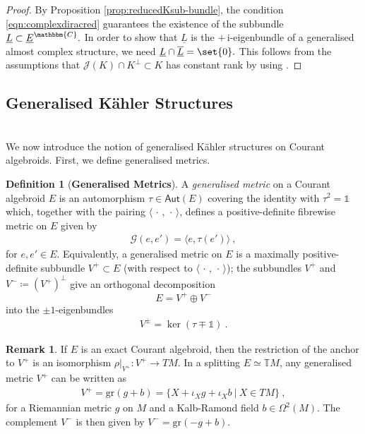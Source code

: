 \documentclass[a4paper, reqno, 11pt]{amsart}
\numberwithin{equation}{section}
\theoremstyle{definition}
\newtheorem{definition}[equation]{Definition}
\newtheorem{remark}[equation]{Remark}
\newcommand{\ip}[1]{\langle #1 \rangle}
\newcommand{\red}[1]{\underline{#1}}
\newcommand{\ii}{\mathrm{i}}
\newcommand{\IC}{\mathbbm{C}}
\newcommand{\IT}{\mathbb{T}}
\newcommand{\cG}{{\mathcal G}}
\newcommand{\cJ}{{\mathcal J}}
\newcommand{\sfOmega}{{\mathsf{\Omega}}}
\newcommand{\unit}{\mathds{1}}   			%
\newcommand{\gr}{\text{gr}}
\theoremstyle{remark}
\begin{document}
\begin{proof}
By Proposition \ref{prop:reducedKsub-bundle}, the condition \eqref{eqn:complexdiracred} guarantees the existence of the subbundle  $\red L  \subset \red E^{\IC}.$ In order to show that $\red L$ is the $+\,\ii$-eigenbundle of a generalised almost complex structure, we need  $\red L \cap \overline{\red L} = \set{0}.$ This follows from the assumptions that $\cJ(K) \cap K^\perp \subset K$  
 has constant rank by using \cite[Lemma 5.1]{Bursztyn2007reduction}. 
\end{proof}

\medskip

\subsection{Generalised K\"{a}hler Structures}~\\[5pt]
We now introduce the notion of generalised K\"ahler structures on Courant algebroids. First, we define generalised metrics.

\begin{definition}[\textbf{Generalised Metrics}]\label{defn:generalisedmetric}
A \emph{generalised metric} on a Courant algebroid $E$ is an automorphism $\tau\in\mathsf{Aut} (E)$ covering the identity with $\tau^2 = \unit$ which, together with the pairing $\ip{\,\cdot\,,\,\cdot\,}$, defines a positive-definite fibrewise metric on $E$ given by
\begin{align}\label{eqn:generalisedmetrictau}
    \cG (e, e') = \ip{e, \tau(e')} \ ,
\end{align}
for $e, e'\in E$. Equivalently, a generalised metric on $E$ is a maximally positive-definite subbundle $V^+ \subset E$  (with respect to $\ip{\,\cdot \, , \, \cdot\,}$); the subbundles $V^+$ and $V^- \coloneqq (V^+)^\perp$ give an orthogonal decomposition $$E = V^+\oplus V^-$$ into the $\pm1$-eigenbundles
\begin{align}
    V^\pm = \ker(\tau\mp\unit) \ .
\end{align}
\end{definition}

\begin{remark} If $E$ is an exact Courant algebroid, then the restriction of the anchor to $V^+$ is an isomorphism $\rho|_{V^+}:V^+\to TM$. In a splitting $E\simeq\IT M$, any generalised metric $V^+$ can be written as
\begin{align}
    V^+ = \gr(g+b) = \{X+\iota_X g+\iota_Xb \ \vert \ X\in TM\} \ ,
\end{align}
for a Riemannian metric $g$ on $M$ and a Kalb-Ramond field $b\in\sfOmega^2(M)$. The complement $V^-$ is then given by $V^-=\gr(-g+b).$
\end{remark}
\end{document}
